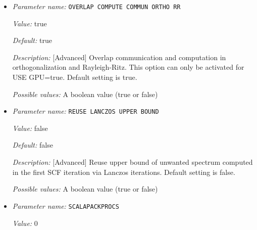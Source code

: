 \begin{itemize}
{\it Value:} true


{\it Default:} true


{\it Description:} [Advanced] Overlap communication and computation in Chebyshev filtering. This option can only be activated for USE GPU=true. Default setting is true.


{\it Possible values:} A boolean value (true or false)
\item {\it Parameter name:} {\tt OVERLAP COMPUTE COMMUN ORTHO RR}
\label{parameters:SCF parameters/Eigen_2dsolver parameters/OVERLAP COMPUTE COMMUN ORTHO RR}
\label{parameters:SCF_20parameters/Eigen_2dsolver_20parameters/OVERLAP_20COMPUTE_20COMMUN_20ORTHO_20RR}


{\it Value:} true


{\it Default:} true


{\it Description:} [Advanced] Overlap communication and computation in orthogonalization and Rayleigh-Ritz. This option can only be activated for USE GPU=true. Default setting is true.


{\it Possible values:} A boolean value (true or false)
\item {\it Parameter name:} {\tt REUSE LANCZOS UPPER BOUND}
\label{parameters:SCF parameters/Eigen_2dsolver parameters/REUSE LANCZOS UPPER BOUND}
\label{parameters:SCF_20parameters/Eigen_2dsolver_20parameters/REUSE_20LANCZOS_20UPPER_20BOUND}


{\it Value:} false


{\it Default:} false


{\it Description:} [Advanced] Reuse upper bound of unwanted spectrum computed in the first SCF iteration via Lanczos iterations. Default setting is false.


{\it Possible values:} A boolean value (true or false)
\item {\it Parameter name:} {\tt SCALAPACKPROCS}
\label{parameters:SCF parameters/Eigen_2dsolver parameters/SCALAPACKPROCS}
\label{parameters:SCF_20parameters/Eigen_2dsolver_20parameters/SCALAPACKPROCS}


{\it Value:} 0



\end{itemize}

